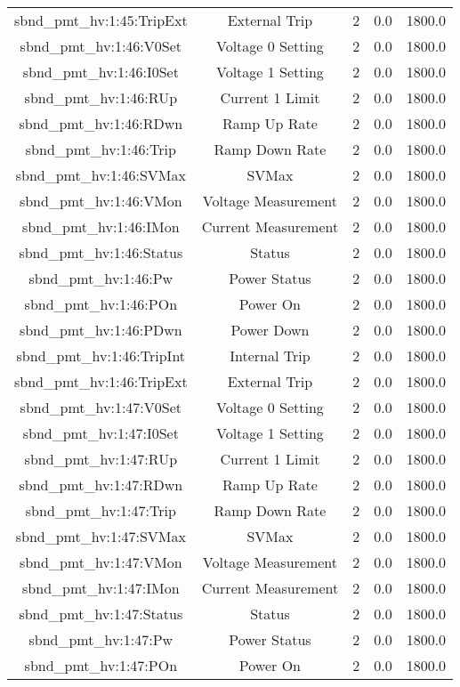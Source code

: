 \begin{table}[ptb]
\begin{tabular}{c | c c c c}
sbnd_pmt_hv:1:45:TripExt & External Trip & 2 & 0.0 & 1800.0\\ 
sbnd_pmt_hv:1:46:V0Set & Voltage 0 Setting & 2 & 0.0 & 1800.0\\ 
sbnd_pmt_hv:1:46:I0Set & Voltage 1 Setting & 2 & 0.0 & 1800.0\\ 
sbnd_pmt_hv:1:46:RUp & Current 1 Limit & 2 & 0.0 & 1800.0\\ 
sbnd_pmt_hv:1:46:RDwn & Ramp Up Rate & 2 & 0.0 & 1800.0\\ 
sbnd_pmt_hv:1:46:Trip & Ramp Down Rate & 2 & 0.0 & 1800.0\\ 
sbnd_pmt_hv:1:46:SVMax & SVMax & 2 & 0.0 & 1800.0\\ 
sbnd_pmt_hv:1:46:VMon & Voltage Measurement & 2 & 0.0 & 1800.0\\ 
sbnd_pmt_hv:1:46:IMon & Current Measurement & 2 & 0.0 & 1800.0\\ 
sbnd_pmt_hv:1:46:Status & Status & 2 & 0.0 & 1800.0\\ 
sbnd_pmt_hv:1:46:Pw & Power Status & 2 & 0.0 & 1800.0\\ 
sbnd_pmt_hv:1:46:POn & Power On & 2 & 0.0 & 1800.0\\ 
sbnd_pmt_hv:1:46:PDwn & Power Down & 2 & 0.0 & 1800.0\\ 
sbnd_pmt_hv:1:46:TripInt & Internal Trip & 2 & 0.0 & 1800.0\\ 
sbnd_pmt_hv:1:46:TripExt & External Trip & 2 & 0.0 & 1800.0\\ 
sbnd_pmt_hv:1:47:V0Set & Voltage 0 Setting & 2 & 0.0 & 1800.0\\ 
sbnd_pmt_hv:1:47:I0Set & Voltage 1 Setting & 2 & 0.0 & 1800.0\\ 
sbnd_pmt_hv:1:47:RUp & Current 1 Limit & 2 & 0.0 & 1800.0\\ 
sbnd_pmt_hv:1:47:RDwn & Ramp Up Rate & 2 & 0.0 & 1800.0\\ 
sbnd_pmt_hv:1:47:Trip & Ramp Down Rate & 2 & 0.0 & 1800.0\\ 
sbnd_pmt_hv:1:47:SVMax & SVMax & 2 & 0.0 & 1800.0\\ 
sbnd_pmt_hv:1:47:VMon & Voltage Measurement & 2 & 0.0 & 1800.0\\ 
sbnd_pmt_hv:1:47:IMon & Current Measurement & 2 & 0.0 & 1800.0\\ 
sbnd_pmt_hv:1:47:Status & Status & 2 & 0.0 & 1800.0\\ 
sbnd_pmt_hv:1:47:Pw & Power Status & 2 & 0.0 & 1800.0\\ 
sbnd_pmt_hv:1:47:POn & Power On & 2 & 0.0 & 1800.0\\ 

\end{tabular}
\end{table}
